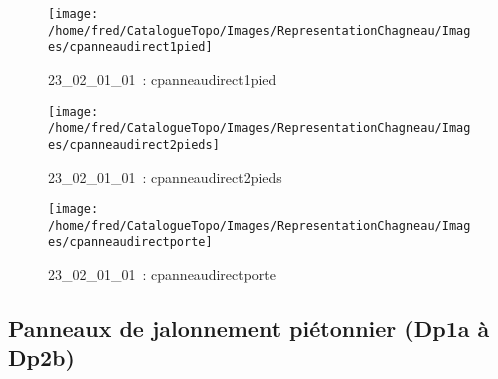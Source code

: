\documentclass[12pt,titlepage]{book}
\begin{document}
\begin{figure}[h!]
  \hfill         %
  \begin{minipage}[t]{3cm}
    \begin{center}
      \texttt{[image: /home/fred/CatalogueTopo/Images/RepresentationChagneau/Images/cpanneaudirect1pied]}
      \caption[~23\_02\_01\_01]{\small{23\_02\_01\_01~:} \tiny{cpanneaudirect1pied}}\label{cpanneaudirect1pied}
    \end{center}
  \end{minipage}
  \begin{minipage}[t]{3cm}
    \begin{center}
      \texttt{[image: /home/fred/CatalogueTopo/Images/RepresentationChagneau/Images/cpanneaudirect2pieds]}
      \caption[~23\_02\_01\_01]{\small{23\_02\_01\_01~:} \tiny{cpanneaudirect2pieds}}\label{cpanneaudirect2pieds}
    \end{center}
  \end{minipage}
  \begin{minipage}[t]{3cm}
    \begin{center}
      \texttt{[image: /home/fred/CatalogueTopo/Images/RepresentationChagneau/Images/cpanneaudirectporte]}
      \caption[~23\_02\_01\_01]{\small{23\_02\_01\_01~:} \tiny{cpanneaudirectporte}}\label{cpanneaudirectporte}
    \end{center}
  \end{minipage}
\end{figure}


\subsection{Panneaux de jalonnement piétonnier (Dp1a à Dp2b)}
\noindent
\vspace{\baselineskip}
\end{document}
